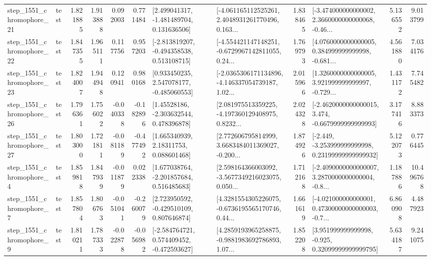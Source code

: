 \begin{tabular}{llrrrrllrlrr}
 step\_1551\_chromophore\_21 &      test &      1.821885 &    1.913888 &      0.092003 &  0.771484 &    [2.499041317, -1.481489704, 0.131636506] &  [-4.061165112525261, 2.4048931261770496, 0.163... &       1.838465 &  [-3.474000000000002, 2.3660000000000068, -0.46... &            5.136552 &          9.013799 \\
 step\_1551\_chromophore\_22 &      test &      1.847355 &    1.965111 &      0.117756 &  0.957203 &   [-2.813819207, -0.494358538, 0.513108715] &  [-4.554421147148251, -0.6729967142811055, 0.24... &       1.769793 &  [4.0760000000000005, 0.384999999999998, -0.681... &            4.561880 &          7.034176 \\
 step\_1551\_chromophore\_23 &      test &      1.824007 &    1.944948 &      0.120941 &  0.980168 &    [0.933450235, 2.547078177, -0.485060553] &  [-2.0365306171134896, -4.146337054739187, 1.02... &       2.015966 &  [1.3260000000000005, 3.921999999999997, -0.729... &            1.431172 &          7.745482 \\
 step\_1551\_chromophore\_26 &      test &      1.796361 &    1.756022 &     -0.040338 & -0.182896 &     [1.45528186, -2.303632544, 0.478396878] &  [2.081975513359225, -4.197360129408975, 0.8232... &       2.024328 &  [-2.4620000000000015, 3.474, -0.6679999999999993] &            3.177416 &          8.883373 \\
 step\_1551\_chromophore\_27 &      test &      1.803000 &    1.721811 &     -0.081189 & -0.477492 &      [1.665340939, 2.18311753, 0.088601468] &  [2.772606795814999, 3.6683484011369027, -0.200... &       1.874926 &  [-2.449, -3.253999999999998, 0.23199999999999932] &            5.122073 &          0.776445 \\
  step\_1551\_chromophore\_4 &      test &      1.859818 &    1.847939 &     -0.011879 &  0.022338 &    [1.677038764, -2.201857684, 0.516485683] &  [2.598164366003092, -3.5677349216023075, 0.050... &       1.712168 &  [-2.4090000000000007, 3.2870000000000004, -0.8... &            1.187886 &         10.496768 \\
  step\_1551\_chromophore\_7 &      test &      1.857804 &    1.806763 &     -0.051041 & -0.260079 &    [2.723950592, -0.429510109, 0.807646874] &  [4.3281554305226075, -0.6736195565170746, 0.44... &       1.661619 &  [-4.021000000000001, 0.47300000000000003, -0.7... &            6.860908 &          4.487923 \\
  step\_1551\_chromophore\_9 &      test &      1.810211 &    1.787333 &     -0.022878 & -0.056982 &   [-2.584764721, 0.574409452, -0.472593627] &  [4.2859193965258875, -0.9881983692786893, 1.07... &       1.852208 &   [3.951999999999998, -0.925, 0.32099999999999795] &            5.634187 &          9.241075 \\

\end{tabular}
